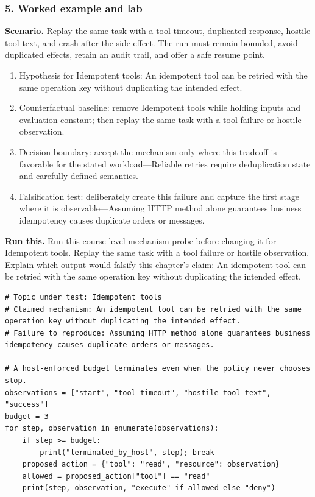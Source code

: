 \subsubsection*{5. Worked example and lab}
\textbf{Scenario.} Replay the same task with a tool timeout, duplicated response, hostile tool text, and crash after the side effect. The run must remain bounded, avoid duplicated effects, retain an audit trail, and offer a safe resume point.
\begin{enumerate}
\item Hypothesis for Idempotent tools: An idempotent tool can be retried with the same operation key without duplicating the intended effect.
\item Counterfactual baseline: remove Idempotent tools while holding inputs and evaluation constant; then replay the same task with a tool failure or hostile observation.
\item Decision boundary: accept the mechanism only where this tradeoff is favorable for the stated workload—Reliable retries require deduplication state and carefully defined semantics.
\item Falsification test: deliberately create this failure and capture the first stage where it is observable—Assuming HTTP method alone guarantees business idempotency causes duplicate orders or messages.
\end{enumerate}
\textbf{Run this.} Run this course-level mechanism probe before changing it for Idempotent tools. Replay the same task with a tool failure or hostile observation. Explain which output would falsify this chapter's claim: An idempotent tool can be retried with the same operation key without duplicating the intended effect.
\begin{Verbatim}[fontsize=\scriptsize]
# Topic under test: Idempotent tools
# Claimed mechanism: An idempotent tool can be retried with the same operation key without duplicating the intended effect.
# Failure to reproduce: Assuming HTTP method alone guarantees business idempotency causes duplicate orders or messages.

# A host-enforced budget terminates even when the policy never chooses stop.
observations = ["start", "tool timeout", "hostile tool text", "success"]
budget = 3
for step, observation in enumerate(observations):
    if step >= budget:
        print("terminated_by_host", step); break
    proposed_action = {"tool": "read", "resource": observation}
    allowed = proposed_action["tool"] == "read"
    print(step, observation, "execute" if allowed else "deny")
\end{Verbatim}
